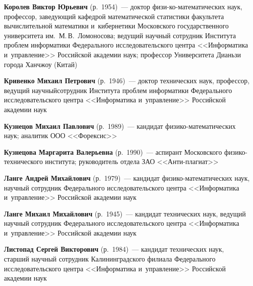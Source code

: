 \begin{multicols}{2}
\vspace*{1pt} 

\noindent
\textbf{Королев Виктор Юрьевич} (р.\ 1954)~---
доктор фи\-зи-\linebreak ко-ма\-те\-ма\-ти\-че\-ских наук, профессор, 
заведующий кафедрой математической статистики факультета вычислительной математики 
и~кибернетики Московского государственного университета им.\ М.\,В.~Ломоносова;
 ведущий научный сотрудник Института проб\-лем информатики Федерального 
 исследовательского центра <<Информатика и~управ\-ле\-ние>> 
 Российской академии наук; профессор Университета Дианьзи города Ханчжоу (Китай)

\vspace*{1pt} 

\noindent
\textbf{Кривенко Михаил Петрович} (р.\ 1946)~--- 
доктор технических наук, профессор, ведущий научный\linebreak сотрудник Института проб\-лем 
информатики Федерального исследовательского центра <<Информатика и~управ\-ле\-ние>>
Российской академии наук

\vspace*{1pt} 


\noindent
\textbf{Кузнецов Михаил Павлович} (р.\ 1989)~---
кандидат фи\-зи\-ко-ма\-те\-ма\-ти\-че\-ских наук; аналитик ООО <<Форексис>>

\vspace*{1pt} 

\noindent
\textbf{Кузнецова Маргарита Валерьевна} (р.\ 1990)~---
аспирант Московского фи\-зи\-ко-тех\-ни\-че\-ско\-го института;
руководитель отдела ЗАО <<Анти-плагиат>>

\vspace*{1pt} 

\noindent
\textbf{Ланге Андрей Михайлович} (р.\ 1979)~---
кандидат фи\-зи\-ко-ма\-те\-ма\-ти\-че\-ских наук, 
научный сотрудник Федерального исследовательского центра <<Информатика и~управ\-ле\-ние>>
Российской академии наук 

\pagebreak

\noindent
\textbf{Ланге Михаил Михайлович} (р.\ 1945)~---
кандидат технических наук, ведущий научный сотрудник Федерального исследовательского 
центра <<Информатика и~управ\-ле\-ние>> Российской академии наук 

\vspace*{3pt} 

\noindent
\textbf{Листопад Сергей Викторович} (р.\ 1984)~---
кандидат технических наук, старший научный сотрудник Калининградского 
филиала Федерального исследовательского центра <<Информатика и~управ\-ле\-ние>>
Российской академии наук


\end{multicols}
